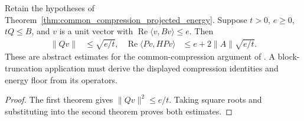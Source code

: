 \begin{theorem}
    \label{thm:common_compression_energy_bound}
    \leanok
    Retain the hypotheses of Theorem~\ref{thm:common_compression_projected_energy}.
    Suppose $t>0$, $e\ge0$, $tQ\le B$, and $v$ is a unit vector with
    $\operatorname{Re}\langle v,Bv\rangle\le e$. Then
    \begin{align*}
        \|Qv\|&\le\sqrt{e/t}, &
        \operatorname{Re}\langle Pv,HPv\rangle&\le e+2\|A\|\sqrt{e/t}.
    \end{align*}
    These are abstract estimates for the common-compression argument of
    \cite[Lemma~6.5]{Arad2013AreaLaw}. A block-truncation application must
    derive the displayed compression identities and energy floor from its operators.
\end{theorem}
\begin{proof}
    \leanok
    The first theorem gives $\|Qv\|^2\le e/t$.
    Taking square roots and substituting into the second theorem proves both estimates.
\end{proof}
